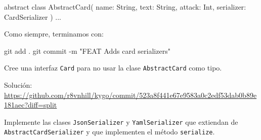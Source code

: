   \begin{kotlin}
    abstract class AbstractCard(
      name: String, text: String, attack: Int,
      serializer: CardSerializer
    ) {...}
  \end{kotlin}

  Como siempre, terminamos con:

  \begin{powershell}
    git add .
    git commit -m "FEAT Adds card serializers"
  \end{powershell}

  \begin{ejercicio}
    Cree una interfaz \texttt{Card} para no usar la clase \texttt{AbstractCard} como tipo.
    
    {\footnotesize Solución: \url{https://github.com/r8vnhill/kygo/commit/523a8f441e67e9583a0c2edf53dab0b89e181aec?diff=split}}
  \end{ejercicio}
    
  \begin{exercise}
    Implemente las clases \texttt{JsonSerializer} y \texttt{YamlSerializer} que extiendan de
    \texttt{AbstractCardSerializer} y que implementen el método \texttt{serialize}.
  \end{exercise}